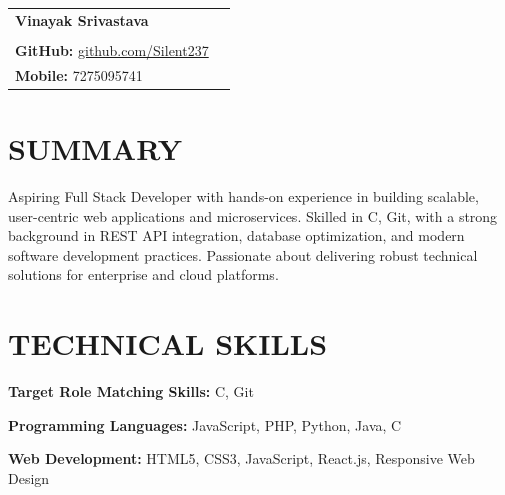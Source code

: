 \documentclass[a4paper,10.9pt]{article}
\begin{document}

\begin{tabularx}{\textwidth}{@{}X r@{}}
{\fontsize{22}{24}\selectfont\bfseries\color{hdrblue}Vinayak Srivastava} & \\[-1pt]
\vspace{1}

\begin{tabular}[t]{@{}l@{}}
{\small\textbf{LinkedIn:}
\href{https://www.linkedin.com/in/vinayak-srivastava-silent}
{linkedin.com/in/vinayak-srivastava-silent}}\\[-2pt]

{\small\textbf{GitHub:}
\href{https://github.com/Silent237}
{github.com/Silent237}}
\end{tabular}

&

\begin{tabular}[t]{@{}r@{}}
{\small\textbf{Email:}
\href{mailto:vinayaksrivastava063@gmail.com}{vinayaksrivastava063@gmail.com}}\\[-2pt]

{\small\textbf{Mobile:} 7275095741}
\end{tabular}

\end{tabularx}

\vspace{-6pt}


\section*{SUMMARY}

Aspiring Full Stack Developer with hands-on experience in building scalable, user-centric web applications and microservices. Skilled in C, Git, with a strong background in REST API integration, database optimization, and modern software development practices. Passionate about delivering robust technical solutions for enterprise and cloud platforms.

\section*{TECHNICAL SKILLS}

\textbf{Target Role Matching Skills:} C, Git

\textbf{Programming Languages:} JavaScript, PHP, Python, Java, C

\textbf{Web Development:} HTML5, CSS3, JavaScript, React.js, Responsive Web Design
\end{document}
